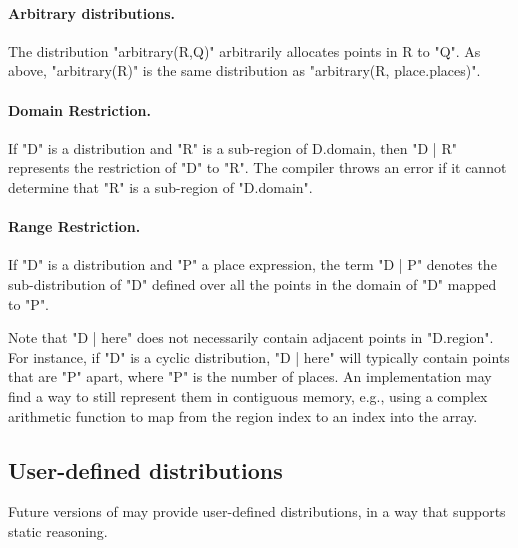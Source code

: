 \paragraph{Arbitrary distributions.} 
The distribution \xcd"arbitrary(R,Q)" arbitrarily allocates points in {\cf
R} to \xcd"Q". As above, \xcd"arbitrary(R)" is the same distribution as
\xcd"arbitrary(R, place.places)".


\paragraph{Domain Restriction.} 

If \xcd"D" is a distribution and \xcd"R" is a sub-region of {\cf
D.domain}, then \xcd"D | R" represents the restriction of \xcd"D" to
\xcd"R".  The compiler throws an error if it cannot determine that
\xcd"R" is a sub-region of \xcd"D.domain".

\paragraph{Range Restriction.}

If \xcd"D" is a distribution and \xcd"P" a place expression, the term
\xcd"D | P" denotes the sub-distribution of \xcd"D" defined over all the
points in the domain of \xcd"D" mapped to \xcd"P".

Note that \xcd"D | here" does not necessarily contain adjacent points
in \xcd"D.region". For instance, if \xcd"D" is a cyclic distribution,
\xcd"D | here" will typically contain points that are \xcd"P" apart,
where \xcd"P" is the number of places. An implementation may find a
way to still represent them in contiguous memory, e.g., using a
complex arithmetic function to map from the region index to an index
into the array.

\subsection{User-defined distributions}

Future versions of \Xten{} may provide user-defined distributions, in
a way that supports static reasoning.


